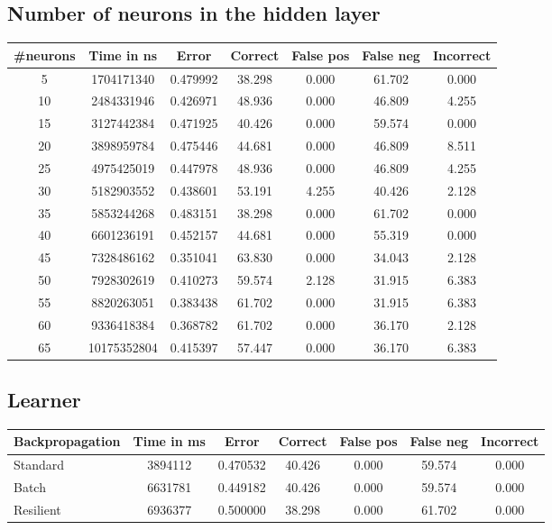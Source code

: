 \documentclass[12pt,a4,notitlepage]{report}
\renewcommand{\_}{\texttt{\symbol{95}}}
\newcommand{\<}{\texttt{\symbol{60}}}
\renewcommand{\>}{\texttt{\symbol{62}}}
\begin{document}
\subsection{Number of neurons in the hidden layer}

\begin{tabular}{c|cccccc}
\#neurons & Time in ns & Error & Correct & False pos & False neg & Incorrect \\ \hline
5 & 1704171340 & 0.479992 & 38.298 & 0.000 & 61.702 & 0.000 \\
10 & 2484331946 & 0.426971 & 48.936 & 0.000 & 46.809 & 4.255 \\
15 & 3127442384 & 0.471925 & 40.426 & 0.000 & 59.574 & 0.000 \\
20 & 3898959784 & 0.475446 & 44.681 & 0.000 & 46.809 & 8.511 \\
25 & 4975425019 & 0.447978 & 48.936 & 0.000 & 46.809 & 4.255 \\
30 & 5182903552 & 0.438601 & 53.191 & 4.255 & 40.426 & 2.128 \\
35 & 5853244268 & 0.483151 & 38.298 & 0.000 & 61.702 & 0.000 \\
40 & 6601236191 & 0.452157 & 44.681 & 0.000 & 55.319 & 0.000 \\
45 & 7328486162 & 0.351041 & 63.830 & 0.000 & 34.043 & 2.128 \\
50 & 7928302619 & 0.410273 & 59.574 & 2.128 & 31.915 & 6.383 \\
55 & 8820263051 & 0.383438 & 61.702 & 0.000 & 31.915 & 6.383 \\
60 & 9336418384 & 0.368782 & 61.702 & 0.000 & 36.170 & 2.128 \\
65 & 10175352804 & 0.415397 & 57.447 & 0.000 & 36.170 & 6.383 \\
\end{tabular}

\subsection{Learner}

\begin{tabular}{l|cccccc}
Backpropagation & Time in ms & Error & Correct & False pos & False neg & Incorrect \\ \hline
Standard & 3894112 & 0.470532 & 40.426 & 0.000 & 59.574 & 0.000 \\
Batch & 6631781 & 0.449182 & 40.426 & 0.000 & 59.574 & 0.000 \\
Resilient & 6936377 & 0.500000 & 38.298 & 0.000 & 61.702 & 0.000 \\
\end{tabular}
\end{document}
